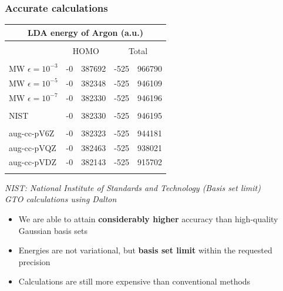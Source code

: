 \begin{frame}
\frametitle{Accurate calculations}
\centering
\begin{table}
    \centering
    \begin{tabular}{lr@{.}lr@{.}l}
    \multicolumn{5}{c}{\textbf{LDA energy of Argon (a.u.)}}\\
    \hline
    \hline
                        &\multicolumn{4}{c}{}   \\
    &\multicolumn{2}{c}{HOMO}
    &\multicolumn{2}{c}{Total}\\
                        &\multicolumn{4}{c}{}   \\
    MW $\epsilon=10^{-3}$  &-0&387692&-525&966790  \\
    MW $\epsilon=10^{-5}$  &-0&382348&-525&946109  \\
    MW $\epsilon=10^{-7}$  &-0&382330&-525&946196  \\
                        &\multicolumn{4}{c}{}   \\
    NIST                &-0&382330&-525&946195  \\
                        &\multicolumn{4}{c}{}   \\
    aug-cc-pV6Z		&-0&382323&-525&944181  \\
    aug-cc-pVQZ		&-0&382463&-525&938021  \\
    aug-cc-pVDZ		&-0&382143&-525&915702  \\
                        &\multicolumn{4}{c}{}   \\
    \hline
    \hline
    \end{tabular}
\end{table}

\vspace{1mm}

\it{NIST: National Institute of Standards and Technology (Basis set limit)}\\
\it{GTO calculations using Dalton}

\vspace{5mm}

\begin{itemize}
    \item   We are able to attain \textbf{considerably higher} accuracy than 
            high-quality Gaussian basis sets
    \item   Energies are not variational, but \textbf{basis set limit} within 
            the requested precision
    \item   Calculations are still more expensive than conventional methods
\end{itemize}

\end{frame}


